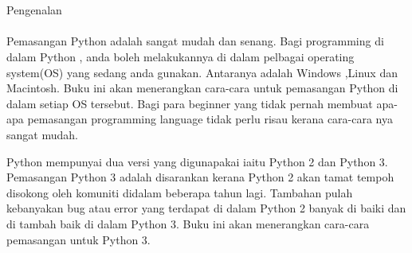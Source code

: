 \section{}
Pengenalan

\paragraph{}
	Pemasangan Python adalah sangat mudah dan senang. Bagi programming di dalam Python , anda boleh melakukannya di dalam pelbagai operating system(OS) yang sedang anda gunakan. Antaranya adalah Windows ,Linux dan Macintosh. Buku ini akan menerangkan cara-cara untuk pemasangan Python di dalam setiap OS tersebut. Bagi para beginner yang tidak pernah membuat apa-apa pemasangan programming language tidak perlu risau kerana cara-cara nya sangat mudah.\newline

	Python mempunyai dua versi yang digunapakai iaitu Python 2 dan Python 3. Pemasangan Python 3 adalah disarankan kerana Python 2 akan tamat tempoh disokong oleh komuniti didalam beberapa tahun lagi. Tambahan pulah kebanyakan bug atau error yang terdapat di dalam Python 2 banyak di baiki dan di tambah baik di dalam Python 3. Buku ini akan menerangkan cara-cara pemasangan untuk Python 3.

\newline


